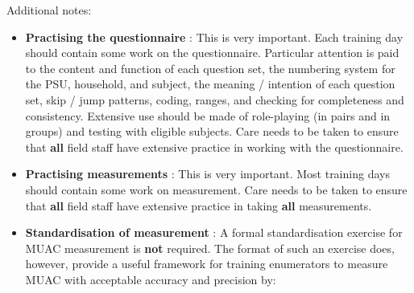 \documentclass[12pt,a4paper]{book}
\theoremstyle{definition}
\theoremstyle{definition}
\theoremstyle{definition}
\theoremstyle{remark}
\begin{document}
Additional notes:

\begin{itemize}
\item
  \textbf{Practising the questionnaire} : This is very important. Each
  training day should contain some work on the questionnaire. Particular
  attention is paid to the content and function of each question set,
  the numbering system for the PSU, household, and subject, the meaning
  / intention of each question set, skip / jump patterns, coding,
  ranges, and checking for completeness and consistency. Extensive use
  should be made of role-playing (in pairs and in groups) and testing
  with eligible subjects. Care needs to be taken to ensure that
  \textbf{all} field staff have extensive practice in working with the
  questionnaire.
\item
  \textbf{Practising measurements} : This is very important. Most
  training days should contain some work on measurement. Care needs to
  be taken to ensure that \textbf{all} field staff have extensive
  practice in taking \textbf{all} measurements.
\item
  \textbf{Standardisation of measurement} : A formal standardisation
  exercise for MUAC measurement is \textbf{not} required. The format of
  such an exercise does, however, provide a useful framework for
  training enumerators to measure MUAC with acceptable accuracy and
  precision by:


\end{itemize}
\end{document}
